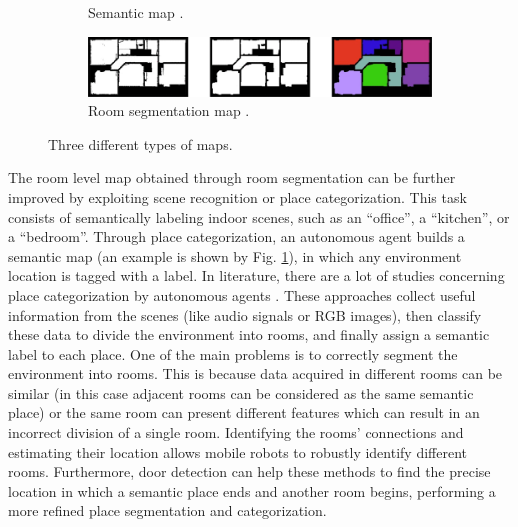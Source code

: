 \begin{figure}[h!]
\begin{subfigure}[b]{0.48\linewidth}
 		\caption{Semantic map \cite{placecategorization}.}
 		\label{fig:semantic_map}
 	\end{subfigure}
 	\newline
 	\newline
 	\begin{subfigure}[b]{0.99\linewidth}
 		\centering
 		\includegraphics[width=\textwidth]{images/roomsegmentation.png}
 		\caption{Room segmentation map \cite{segmentation3d}.}
 		\label{fig:room_segmentation_map}
 	\end{subfigure}
 	\caption{Three different types of maps.}
 	
 \end{figure}
 
 The room level map obtained through room segmentation can be further improved by exploiting scene recognition or place categorization. This task consists of semantically labeling indoor scenes, such as an ``office'', a ``kitchen'', or a ``bedroom''. Through place categorization, an autonomous agent builds a semantic map (an example is shown by Fig. \ref{fig:semantic_map}), in which any environment location is tagged with a label. In literature, there are a lot of studies concerning place categorization by autonomous agents \cite{scenerecognitionaudio, scenerecognitiononjectdetection, placecategorization, placecategorizationlargescale}. These approaches collect useful information from the scenes (like audio signals or RGB images), then classify these data to divide the environment into rooms, and finally assign a semantic label to each place. One of the main problems is to correctly segment the environment into rooms. This is because data acquired in different rooms can be similar (in this case adjacent rooms can be considered as the same semantic place) or the same room can present different features which can result in an incorrect division of a single room. Identifying the rooms' connections and estimating their location allows mobile robots
 to robustly identify different rooms. Furthermore, door detection can help these methods to find the precise location in which a semantic place ends and another room begins, performing a more refined place segmentation and categorization.  
 
